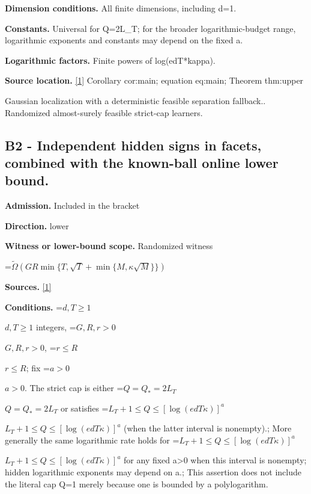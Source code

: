 \documentclass[10pt,a4paper]{article}
\newcommand{\AtlasMath}[1]{\par\begingroup\centering\setbox0=\hbox{$\displaystyle #1$}\ifdim\wd0>1.4\linewidth\typeout{ATLAS WIDE FORMULA: \the\wd0}\fi\ifdim\wd0>\linewidth\resizebox{\linewidth}{!}{\box0}\else\box0\fi\par\endgroup}
\newcommand{\AtlasInlineMath}[1]{\begingroup\setbox0=\hbox{$#1$}\ifdim\wd0>.4\linewidth\endgroup\AtlasMath{#1}\else\endgroup$#1$\fi}
\begin{document}
\textbf{Dimension conditions.} All finite dimensions, including d=1.



\textbf{Constants.} Universal for Q=2L\_T; for the broader logarithmic-budget range, logarithmic exponents and constants may depend on the fixed a.



\textbf{Logarithmic factors.} Finite powers of log(edT*kappa).



\textbf{Source location.} \href{https://github.com/WU-Wendao/Colombo/blob/main/colombo_sensorium/Complexity_altas/data/sources/colombo/U08/manuscript.pdf}{[1]} Corollary cor:main; equation eq:main; Theorem thm:upper



Gaussian localization with a deterministic feasible separation fallback.. Randomized almost-surely feasible strict-cap learners.



\subsection{B2 - Independent hidden signs in facets, combined with the known-ball online lower bound.}


\textbf{Admission.} Included in the bracket



\textbf{Direction.} lower



\textbf{Witness or lower-bound scope.} Randomized witness



\AtlasMath{\widetilde\Omega(GR\min\{T,\sqrt T+\min\{M,\kappa\sqrt M\}\})}


\textbf{Sources.} \href{https://github.com/WU-Wendao/Colombo/blob/main/colombo_sensorium/Complexity_altas/data/sources/colombo/U08/manuscript.pdf}{[1]}



\textbf{Conditions.} \AtlasInlineMath{d,T\ge1} integers, \AtlasInlineMath{G,R,r>0}, \AtlasInlineMath{r\le R}; fix \AtlasInlineMath{a>0}. The strict cap is either \AtlasInlineMath{Q=Q_*=2L_T} or satisfies \AtlasInlineMath{L_T+1\le Q\le[\log(edT\kappa)]^a} (when the latter interval is nonempty).; More generally the same logarithmic rate holds for \AtlasInlineMath{L_T+1\le Q\le[\log(edT\kappa)]^a} for any fixed a>0 when this interval is nonempty; hidden logarithmic exponents may depend on a.; This assertion does not include the literal cap Q=1 merely because one is bounded by a polylogarithm.
\end{document}
